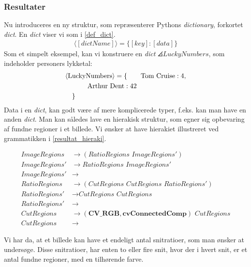{\subsubsection{Resultater}
Nu introduceres en ny struktur, som repræsenterer Pythons
\emph{dictionary}, forkortet \emph{dict}.  En \emph{dict} viser vi som i
\ref{def_dict}.
\begin{eqnarray}
    \langle[\textit{dictName}]\rangle = \{ [\textit{key}] : [\textit{data}] \}
    \label{def_dict}
\end{eqnarray}
Som et simpelt eksempel, kan vi konstruere en \emph{dict}
$\angles{LuckyNumbers}$, som indeholder personers lykketal:
\begin{multline}
    \angles{LuckyNumbers} = \{ \qquad \textrm{Tom Cruise} : 4 , \\
    \textrm{Arthur Dent} : 42 \qquad\qquad\\
    \shoveleft{\}}\shoveright{}
    \label{lucky_dict}
\end{multline}
Data i en \emph{dict}, kan godt være af mere komplicerede typer, f.eks.
kan man have en anden \emph{dict}. Man kan således lave en hierakisk
struktur, som egner sig opbevaring af fundne regioner i et billede. Vi
ønsker at have hierakiet illustreret ved grammatikken i
\eqref{resultat_hieraki}.

\begin{equation}
    \begin{split}
        \textit{ImageRegions}  & \to  (\textit{RatioRegions~ImageRegions}')\\
        \textit{ImageRegions}' & \to  \textit{RatioRegions~ImageRegions}'\\
        \textit{ImageRegions}' & \to  \\
        \textit{RatioRegions}  & \to  (\textit{CutRegions~CutRegions~RatioRegions}')\\
        \textit{RatioRegions}' & \to  \textit{CutRegions~CutRegions}\\
        \textit{RatioRegions}' & \to  \\
        \textit{CutRegions}    & \to  (\textbf{CV\_RGB}, \textbf{cvConnectedComp})\textit{~CutRegions} \\
        \textit{CutRegions}    & \to
    \end{split}
    \label{resultat_hieraki}
\end{equation}

Vi har da, at et billede kan have et endeligt antal snitratioer, som man
ønsker at undersøge. Disse snitratioer, har enten to eller fire snit,
hvor der i hvert snit, er et antal fundne regioner, med en tilhørende farve.

}
